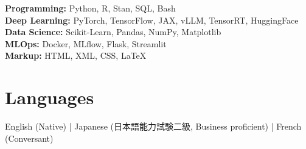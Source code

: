 \documentclass[11pt,a4paper]{article}
\newcommand{\jp}[1]{{\japanesefont #1}}
\begin{document}
\noindent\textbf{Programming:} Python, R, Stan, SQL, Bash\\
\textbf{Deep Learning:} PyTorch, TensorFlow, JAX, vLLM, TensorRT, HuggingFace\\
\textbf{Data Science:} Scikit-Learn, Pandas, NumPy, Matplotlib\\
\textbf{MLOps:} Docker, MLflow, Flask, Streamlit\\
\textbf{Markup:} HTML, XML, CSS, \LaTeX

\section*{Languages}

\noindent English (Native) | Japanese (\jp{日本語能力試験二級}, Business proficient) | French (Conversant)
\end{document}
